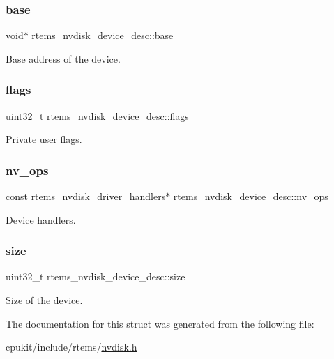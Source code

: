 \subsubsection{\texorpdfstring{base}{base}}
{\footnotesize\ttfamily void$\ast$ rtems\+\_\+nvdisk\+\_\+device\+\_\+desc\+::base}

Base address of the device. \mbox{\label{structrtems__nvdisk__device__desc_a920eb7a82dee701f6283a0a24689d86b}} 
\subsubsection{\texorpdfstring{flags}{flags}}
{\footnotesize\ttfamily uint32\+\_\+t rtems\+\_\+nvdisk\+\_\+device\+\_\+desc\+::flags}

Private user flags. \mbox{\label{structrtems__nvdisk__device__desc_a7ebc4cd3f29ac89044d48be30f3a8df8}} 
\subsubsection{\texorpdfstring{nv\_ops}{nv\_ops}}
{\footnotesize\ttfamily const \mbox{\hyperlink{structrtems__nvdisk__driver__handlers}{rtems\+\_\+nvdisk\+\_\+driver\+\_\+handlers}}$\ast$ rtems\+\_\+nvdisk\+\_\+device\+\_\+desc\+::nv\+\_\+ops}

Device handlers. \mbox{\label{structrtems__nvdisk__device__desc_a8320a2ce7d05b6b158d303a6f0512908}} 
\subsubsection{\texorpdfstring{size}{size}}
{\footnotesize\ttfamily uint32\+\_\+t rtems\+\_\+nvdisk\+\_\+device\+\_\+desc\+::size}

Size of the device. 

The documentation for this struct was generated from the following file\+:\begin{DoxyCompactItemize}
\item 
cpukit/include/rtems/\mbox{\hyperlink{nvdisk_8h}{nvdisk.\+h}}\end{DoxyCompactItemize}
